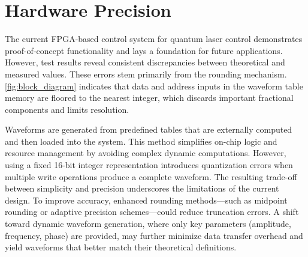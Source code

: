 

\section{Hardware Precision}

The current FPGA-based control system for quantum laser control demonstrates proof-of-concept functionality and lays a foundation for future applications. However, test results reveal consistent discrepancies between theoretical and measured values. These errors stem primarily from the rounding mechanism. \autoref{fig:block_diagram} indicates that data and address inputs in the waveform table memory are floored to the nearest integer, which discards important fractional components and limits resolution.

Waveforms are generated from predefined tables that are externally computed and then loaded into the system. This method simplifies on-chip logic and resource management by avoiding complex dynamic computations. However, using a fixed 16-bit integer representation introduces quantization errors when multiple write operations produce a complete waveform. The resulting trade-off between simplicity and precision underscores the limitations of the current design. To improve accuracy, enhanced rounding methods—such as midpoint rounding or adaptive precision schemes—could reduce truncation errors. A shift toward dynamic waveform generation, where only key parameters (amplitude, frequency, phase) are provided, may further minimize data transfer overhead and yield waveforms that better match their theoretical definitions.

